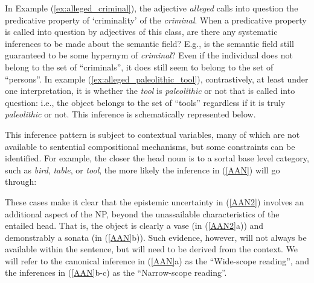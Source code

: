 \documentclass[10pt]{article}
\begin{document}
\noindent 
In Example (\ref{ex:alleged_criminal}), the adjective \emph{alleged} calls into question the predicative property of `criminality' of the \emph{criminal}. When a predicative property is called into question by adjectives of this class, are
there any systematic inferences to be made about the semantic field? E.g., is the semantic field still guaranteed to be some hypernym of
\emph{criminal}? Even if the individual does not belong to the set of
``criminals'', it does still seem to belong to the set of ``persons''. In
example (\ref{ex:alleged_paleolithic_tool}), contrastively, at least under one
interpretation, it is whether the \emph{tool} is \emph{paleolithic} or not that
is called into question: i.e., the object belongs to the set of ``tools''
regardless if it is truly \emph{paleolithic} or not.
This inference is schematically represented below.

\vspace{-0.5em}
\vspace{-0.5em}

\noindent 
This inference pattern is subject to contextual variables, many of which are not available to sentential compositional mechanisms, but some constraints can be identified. For example, the closer the head noun is to a sortal base level category, such as  {\it bird}, {\it table}, or {\it tool}, the more likely the inference in (\ref{AAN}) will go through:

\vspace{-0.5em}


\vspace{-0.5em}

\noindent These cases make it clear that the epistemic uncertainty in (\ref{AAN2}) involves an additional aspect of the NP,  beyond the unassailable characteristics of the entailed head. That is, the object is clearly a vase (in (\ref{AAN2}a)) and demonstrably a sonata (in (\ref{AAN}b)). Such evidence, however, will not always be available within the  sentence, but will need to be derived from the context.  We will refer to the canonical inference in (\ref{AAN}a) as the ``Wide-scope reading'', and the inferences in 
(\ref{AAN}b-c) as the ``Narrow-scope reading''. 
\end{document}
